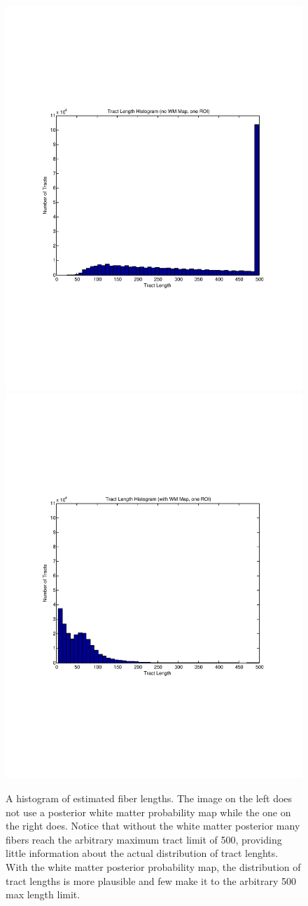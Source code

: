 \begin{figure} \label{fig:singelengthhistograms}
	\includegraphics[trim = 20mm 70mm 20mm 70mm, clip, width=0.5\linewidth]
	  {hist_length_nomask_single}
	\includegraphics[trim = 20mm 70mm 20mm 70mm, clip, width=0.5\linewidth]
	  {hist_length_mask_single}
	\caption{A histogram of estimated fiber lengths.  The image on the left does not use a posterior white matter probability map while the one on the right does.  Notice that without the white matter posterior many fibers reach the arbitrary maximum tract limit of 500, providing little information about the actual distribution of tract lenghts.  With the white matter posterior probability map, the distribution of tract lengths is more plausible and few make it to the arbitrary 500 max length limit.}
\end{figure}

